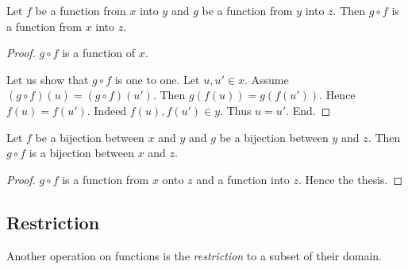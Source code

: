 \documentclass[../../set-theory.ftl.tex]{subfiles}
\begin{document}
\begin{forthel}
    \begin{proposition}\label{SetTheory_02_01_784576}
      Let $f$ be a function from $x$ into $y$ and $g$ be a function from $y$ into $z$.
      Then $g \circ f$ is a function from $x$ into $z$.
    \end{proposition}
    \begin{proof}
      $g \circ f$ is a function of $x$.

      Let us show that $g \circ f$ is one to one.
        Let $u,u' \in x$.
        Assume $(g \circ f)(u) = (g \circ f)(u')$.
        Then $g(f(u)) = g(f(u'))$.
        Hence $f(u) = f(u')$.
        Indeed $f(u), f(u') \in y$.
        Thus $u = u'$.
      End.
    \end{proof}

    \begin{corollary}\label{SetTheory_02_01_627406}
      Let $f$ be a bijection between $x$ and $y$ and $g$ be a bijection between $y$ and $z$.
      Then $g \circ f$ is a bijection between $x$ and $z$.
    \end{corollary}
    \begin{proof}
      $g \circ f$ is a function from $x$ onto $z$ and a function into $z$.
      Hence the thesis.
    \end{proof}
  \end{forthel}


  \subsection{Restriction}

  Another operation on functions is the \textit{restriction} to a subset of
  their domain.
\end{document}
